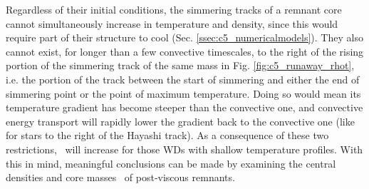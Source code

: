Regardless of their initial conditions, the simmering tracks of a remnant core cannot simultaneously increase in temperature and density, since this would require part of their structure to cool (Sec. \ref{ssec:c5_numericalmodels}).  They also cannot exist, for longer than a few convective timescales, to the right of the rising portion of the simmering track of the same mass in Fig. \ref{fig:c5_runaway_rhot}, i.e. the portion of the track between the start of simmering and either the end of simmering point or the point of maximum temperature.  Doing so would mean its temperature gradient has become steeper than the convective one, and convective energy transport will rapidly lower the gradient back to the convective one (like for stars to the right of the Hayashi track).  As a consequence of these two restrictions, \Mcrit\ will increase for those WDs with shallow temperature profiles.  With this in mind, meaningful conclusions can be made by examining the central densities and core masses \Mc\ of post-viscous remnants.


